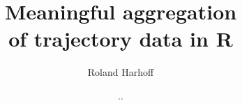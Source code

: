 \documentclass[12pt, oneside, a4paper]{scrbook}
\let\proglang=\textsf
\begin{document}





\titlehead{\center Westf\"alische Wilhelms-Universit\"at M\"unster - Institut f\"ur Geoinformatik (ifgi) \\ University of M\"unster - Institute for Geoinformatics (ifgi)}
\title{Meaningful aggregation \\ of trajectory data in \proglang{R}}
\subtitle{}
\author{Roland Harhoff}
\subject{Bachelorarbeit - Bachelor Thesis}
\publishers{Advisor: \\ Prof. Edzer Pebesma \\ Dr. Benedikt Gr\"aler}
\date{\the\day.\the\month.\the\year}

\end{document}
